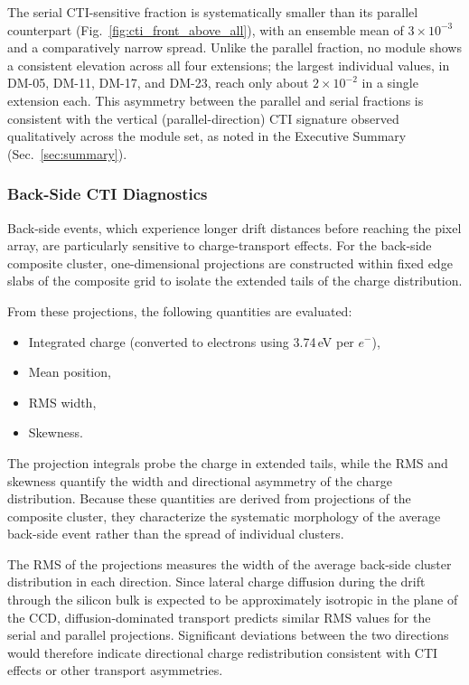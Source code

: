 \documentclass[11pt]{article}
\begin{document}
The serial CTI-sensitive fraction is systematically smaller than its parallel counterpart (Fig.~\ref{fig:cti_front_above_all}), with an ensemble mean of $3\times10^{-3}$ and a comparatively narrow spread. Unlike the parallel fraction, no module shows a consistent elevation across all four extensions; the largest individual values, in DM-05, DM-11, DM-17, and DM-23, reach only about $2\times10^{-2}$ in a single extension each. This asymmetry between the parallel and serial fractions is consistent with the vertical (parallel-direction) CTI signature observed qualitatively across the module set, as noted in the Executive Summary (Sec.~\ref{sec:summary}).

\subsubsection*{Back-Side CTI Diagnostics}

Back-side events, which experience longer drift distances before reaching the pixel array, are particularly sensitive to charge-transport effects. 
For the back-side composite cluster, one-dimensional projections are constructed within fixed edge slabs of the composite grid to isolate the extended tails of the charge distribution.

From these projections, the following quantities are evaluated:

\begin{itemize}
\item Integrated charge (converted to electrons using 3.74\,eV per $e^{-}$),
\item Mean position,
\item RMS width,
\item Skewness.
\end{itemize}

The projection integrals probe the charge in extended tails, while the RMS and skewness quantify the width and directional asymmetry of the charge distribution. 
Because these quantities are derived from projections of the composite cluster, they characterize the systematic morphology of the average back-side event rather than the spread of individual clusters.

The RMS of the projections measures the width of the average back-side cluster distribution in each direction. 
Since lateral charge diffusion during the drift through the silicon bulk is expected to be approximately isotropic in the plane of the CCD, diffusion-dominated transport predicts similar RMS values for the serial and parallel projections. 
Significant deviations between the two directions would therefore indicate directional charge redistribution consistent with CTI effects or other transport asymmetries.
\end{document}
